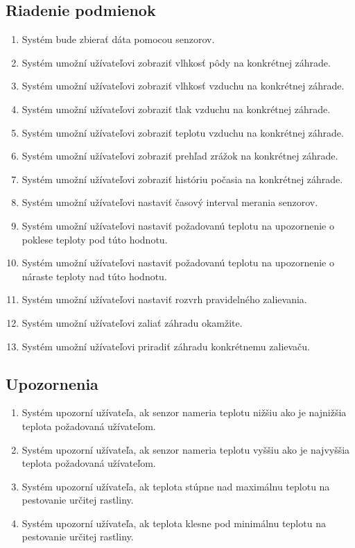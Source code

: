 \documentclass[twoside]{ctuthesis}
\theoremstyle{plain}
\theoremstyle{definition}
\theoremstyle{note}
\begin{document}
\subsection*{Riadenie podmienok}
\begin{enumerate}
\item Systém bude zbierať dáta pomocou senzorov.
\item Systém umožní užívateľovi zobraziť  vlhkosť pôdy na konkrétnej záhrade.
\item Systém umožní užívateľovi zobraziť  vlhkosť vzduchu na konkrétnej záhrade.
\item Systém umožní užívateľovi zobraziť  tlak vzduchu na konkrétnej záhrade.
\item Systém umožní užívateľovi zobraziť  teplotu vzduchu na konkrétnej záhrade. 
\item Systém umožní užívateľovi zobraziť prehľad zrážok na konkrétnej záhrade.
\item Systém umožní užívateľovi zobraziť históriu počasia na konkrétnej záhrade.
\item Systém umožní užívateľovi nastaviť časový interval merania senzorov.
\item Systém umožní užívateľovi nastaviť požadovanú teplotu na upozornenie o poklese teploty pod túto hodnotu.
\item Systém umožní užívateľovi nastaviť požadovanú teplotu na upozornenie o náraste teploty nad túto hodnotu.
\item Systém umožní užívateľovi nastaviť rozvrh pravidelného zalievania.
\item Systém umožní užívateľovi zaliať záhradu okamžite.
\item Systém umožní užívateľovi priradiť záhradu konkrétnemu zalievaču.
\end{enumerate}

\subsection*{Upozornenia}
\begin{enumerate}
\item Systém upozorní užívateľa, ak senzor nameria teplotu nižšiu ako je najnižšia teplota požadovaná užívateľom.
\item Systém upozorní užívateľa, ak senzor nameria teplotu vyššiu ako je najvyššia teplota požadovaná užívateľom.
\item Systém upozorní užívateľa, ak teplota stúpne nad maximálnu teplotu na pestovanie určitej rastliny.
\item Systém upozorní užívateľa, ak teplota klesne pod minimálnu teplotu na pestovanie určitej rastliny.
\end{enumerate}
\end{document}
